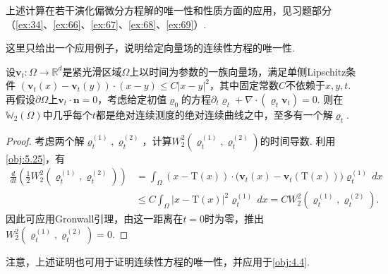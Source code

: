 上述计算在若干演化偏微分方程解的唯一性和性质方面的应用，见习题部分（\autoref{ex:34}、\autoref{ex:66}、\autoref{ex:67}、\autoref{ex:68}、\autoref{ex:69}）.

这里只给出一个应用例子，说明给定向量场的连续性方程的唯一性.

\begin{proposition}\label{obj:5.26}
设$\mathbf v_t:\Omega\to\mathbb R^d$是紧光滑区域$\Omega$上以时间为参数的一族向量场，满足单侧Lipschitz条件
$(\mathbf v_t(x)-\mathbf v_t(y))\cdot(x-y)\le C|x-y|^2$，其中固定常数$C$不依赖于$x,y,t$. 再假设$\partial\Omega$上$\mathbf v_t\cdot\mathbf n=0$，考虑给定初值$\varrho_0$的方程$\partial_t\varrho_t+\nabla\cdot(\varrho_t\mathbf v_t)=0$. 则在$\mathbb W_2(\Omega)$中几乎每个$t$都是绝对连续测度的绝对连续曲线之中，至多有一个解$\varrho_t$.
\end{proposition}
\begin{proof}
考虑两个解$\varrho_t^{(1)},\varrho_t^{(2)}$，计算$W_2^2(\varrho_t^{(1)},\varrho_t^{(2)})$的时间导数. 利用\autoref{obj:5.25}，有
\[
\begin{aligned}
\frac d{dt}\left(\frac12W_2^2(\varrho_t^{(1)},\varrho_t^{(2)})\right)
&=\int_\Omega(x-\mathrm T(x))\cdot\bigl(\mathbf v_t(x)-\mathbf v_t(\mathrm T(x))\bigr)\varrho_t^{(1)}\,dx\\
&\le C\int_\Omega|x-\mathrm T(x)|^2\varrho_t^{(1)}\,dx
=CW_2^2(\varrho_t^{(1)},\varrho_t^{(2)}).
\end{aligned}
\]
因此可应用Gronwall引理，由这一距离在$t=0$时为零，推出$W_2^2(\varrho_t^{(1)},\varrho_t^{(2)})=0$.
\end{proof}

注意，上述证明也可用于证明连续性方程的唯一性，并应用于\autoref{obj:4.4}.

